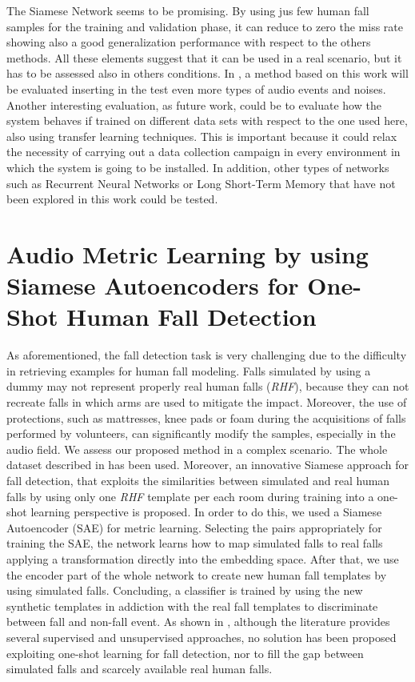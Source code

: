 The Siamese Network seems to be promising. By using jus few human fall samples for the training and validation phase, it can reduce to zero the miss rate showing also a good generalization performance with respect to the others methods. All these elements suggest that it can be used in a real scenario, but it has to be assessed also in others conditions.
In , a method based on this work will be evaluated inserting in the test even more types of audio events and noises.
Another interesting evaluation, as future work, could be to evaluate how the system behaves if trained on different data sets with respect to the one used here, also using transfer learning techniques. This is important because it could relax the necessity of carrying out a data collection campaign in every environment in which the system is going to be installed. In addition, other types of networks such as Recurrent Neural Networks or Long Short-Term Memory that have not been explored in this work could be tested.




\section{Audio Metric Learning by using Siamese Autoencoders for One-Shot Human Fall Detection}
\label{sec:siamese_one_shot}

As aforementioned, the fall detection task is very challenging due to the difficulty in retrieving examples for human fall modeling. Falls simulated by using a dummy may not represent properly real human falls (\textit{RHF}), because they can not recreate falls in which arms are used to mitigate the impact. Moreover, the use of protections, such as mattresses, knee pads or foam during the acquisitions of falls performed by volunteers, can significantly modify the samples, especially in the audio field. 
We assess our proposed method in a complex scenario. The whole dataset described in  has been used.
Moreover, an innovative Siamese approach for fall detection, that exploits the similarities between simulated and real human falls by using only one \textit{RHF} template per each room during training into a one-shot learning perspective is proposed.
In order to do this, we used a Siamese Autoencoder (SAE) for metric learning. Selecting the pairs appropriately for training the SAE, the network learns how to map simulated falls to real falls applying a transformation directly into the embedding space. After that, we use the encoder part of the whole network to create new human fall templates by using simulated falls. Concluding, a classifier is trained by using the new synthetic templates in addiction with the real fall templates to discriminate between fall and non-fall event.
As shown in , although the literature provides several supervised and unsupervised approaches, no solution has been proposed exploiting one-shot learning for fall detection, nor to fill the gap between simulated falls and scarcely available real human falls.


